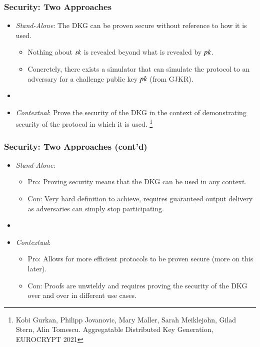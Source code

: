 \documentclass[hyperref={pdfpagelabels=true},table,dvipsnames,14pt,aspectratio=169]{beamer}
\begin{document}
\begin{frame}
  \frametitle{Security: Two Approaches}

  \begin{itemize}
    \item<1-> \emph{Stand-Alone}: The DKG can be proven secure without reference to how it is used.
    \begin{itemize}
      \item<2-> Nothing about $\mathit{sk}$ is revealed beyond what is revealed by $\mathit{pk}$.
      \item<3-> Concretely, there exists a simulator that can simulate the protocol to an adversary for a challenge public key $\mathit{pk}$ (from GJKR).
    \end{itemize}

    \item[]
    \item<4-> \emph{Contextual}: Prove the security of the DKG in the context of demonstrating security of the protocol in which it is used.
  \footnote{
  Kobi Gurkan, Philipp Jovanovic, Mary Maller, Sarah Meiklejohn, Gilad Stern, Alin Tomescu.
  Aggregatable Distributed Key Generation, EUROCRYPT 2021 }
  \end{itemize}
\end{frame}

\begin{frame}
  \frametitle{Security: Two Approaches (cont'd)}

  \begin{itemize}
    \item<1-> \emph{Stand-Alone}:
  \begin{itemize}
    \item<2-> Pro: Proving security means that the DKG can be used in any context.
    \item<3-> Con: Very hard definition to achieve, requires guaranteed output delivery as adversaries can simply stop participating.
    \end{itemize}
    \item[]
    \item<4-> \emph{Contextual}:
  \begin{itemize}
    \item<5-> Pro: Allows for more efficient protocols to be proven secure (more on this later).
    \item<6-> Con: Proofs are unwieldy and requires proving the security of the DKG over and over in different use cases.
    \end{itemize}
  \end{itemize}
\end{frame}
\end{document}
